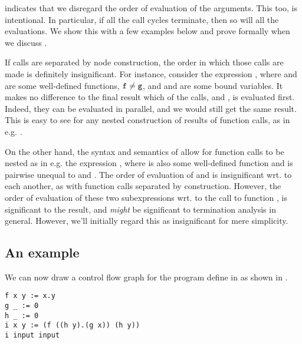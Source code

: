  indicates that we disregard the
order of evaluation of the arguments. This too, is intentional.  In particular,
if all the call cycles terminate, then so will all the evaluations. We show
this with a few examples below and prove formally when we discuss
.

If calls are separated by node construction, the order in which those calls are
made is definitely insignificant. For instance, consider the expression
, where  and  are some well-defined
functions, $\text{{\ttfamily f}}\neq\text{{\ttfamily g}}$, and  and  are
some bound variables. It makes no difference to the final result which of the
calls,  and , is evaluated first. Indeed, they can be
evaluated in parallel, and we would still get the same result. This is easy to
see for any nested construction of results of function calls, as in e.g.
.

On the other hand, the syntax and semantics of \D{} allow for function calls to
be nested as in e.g. the expression , where  is
also some well-defined function and is pairwise unequal to  and
. The order of evaluation of  and  is
insignificant wrt. to each another, as with function calls separated by
construction. However, the order of evaluation of these two subexpressions wrt.
to the call to function , is significant to the result, and
\emph{might} be significant to termination analysis in general. However, we'll
initially regard this as insignificant for mere simplicity.

\subsection{An example}

We can now draw a control flow graph for the program define in
 as shown in .

\begin{lstlisting}[label=listing:cfg-sample-1,caption={A sample \D{} program, always returning \mono{0.0.0}.}]
f x y := x.y
g _ := 0
h _ := 0
i x y := (f ((h y).(g x)) (h y))
i input input
\end{lstlisting}


